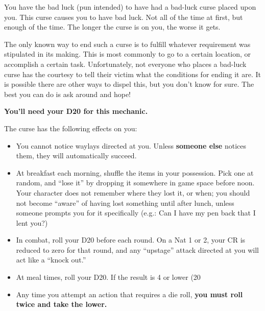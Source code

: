 \documentclass[green]{GL2020}
\begin{document}
\name{\gBadLuckCurse{}}

You have the bad luck (pun intended) to have had a bad-luck curse placed upon you. This curse causes you to have bad luck. Not all of the time at first, but enough of the time. The longer the curse is on you, the worse it gets.

The only known way to end such a curse is to fulfill whatever requirement was stipulated in its making. This is most commonly to go to a certain location, or accomplish a certain task. Unfortunately, not everyone who places a bad-luck curse has the courtesy to tell their victim what the conditions for ending it are. It is possible there are other ways to dispel this, but you don’t know for sure. The best you can do is ask around and hope!

\textbf{You’ll need your D20  for this mechanic.}

The curse has the following effects on you:
\begin{itemize}
  \item You cannot notice waylays directed at you. Unless \textbf{someone else} notices them, they will automatically succeed.
  \item At breakfast each morning, shuffle the items in your possession. Pick one at random, and ``lose it'' by dropping it somewhere in game space before noon. Your character does not remember where they lost it, or when; you should not become ``aware'' of having lost something until after lunch, unless someone prompts you for it specifically (e.g.: Can I have my pen back that I lent you?)
  \item In combat, roll your D20 before each round. On a Nat 1 or 2, your CR is reduced to zero for that round, and any ``upstage'' attack directed at you will act like a ``knock out.''
  \item At meal times, roll your D20. If the result is 4 or lower (20%
  \item Any time you attempt an action that requires a die roll, \textbf{you must roll twice and take the lower.}
\end{itemize}
\end{document}
